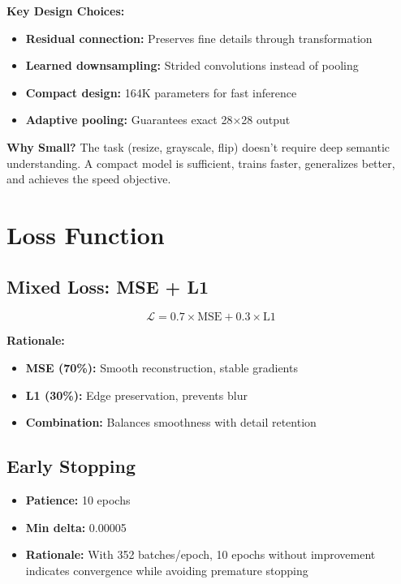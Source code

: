 \documentclass[11pt,a4paper]{article}
\begin{document}
\textbf{Key Design Choices:}
\begin{itemize}
    \item \textbf{Residual connection:} Preserves fine details through transformation
    \item \textbf{Learned downsampling:} Strided convolutions instead of pooling
    \item \textbf{Compact design:} 164K parameters for fast inference
    \item \textbf{Adaptive pooling:} Guarantees exact 28×28 output
\end{itemize}

\textbf{Why Small?} The task (resize, grayscale, flip) doesn't require deep semantic understanding. A compact model is sufficient, trains faster, generalizes better, and achieves the speed objective.

\section{Loss Function}

\subsection{Mixed Loss: MSE + L1}

\begin{equation}
\mathcal{L} = 0.7 \times \text{MSE} + 0.3 \times \text{L1}
\end{equation}

\textbf{Rationale:}
\begin{itemize}
    \item \textbf{MSE (70\%):} Smooth reconstruction, stable gradients
    \item \textbf{L1 (30\%):} Edge preservation, prevents blur
    \item \textbf{Combination:} Balances smoothness with detail retention
\end{itemize}

\subsection{Early Stopping}

\begin{itemize}
    \item \textbf{Patience:} 10 epochs
    \item \textbf{Min delta:} 0.00005
    \item \textbf{Rationale:} With 352 batches/epoch, 10 epochs without improvement indicates convergence while avoiding premature stopping
\end{itemize}
\end{document}
